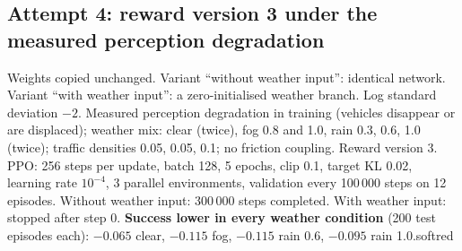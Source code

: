 \subsection{Attempt 4: reward version 3 under the measured perception degradation}
{Weights copied unchanged. Variant ``without weather input'': identical network. Variant ``with weather input'': a zero-initialised weather branch. Log standard deviation $-2$.}
{Measured perception degradation in training (vehicles disappear or are displaced); weather mix: clear (twice), fog 0.8 and 1.0, rain 0.3, 0.6, 1.0 (twice); traffic densities 0.05, 0.05, 0.1; no friction coupling. Reward version 3.}
{PPO: 256 steps per update, batch 128, 5 epochs, clip 0.1, target KL 0.02, learning rate $10^{-4}$, 3 parallel environments, validation every 100\,000 steps on 12 episodes. Without weather input: 300\,000 steps completed. With weather input: stopped after step 0.}
{\textbf{Success lower in every weather condition} (200 test episodes each): $-0.065$ clear, $-0.115$ fog, $-0.115$ rain 0.6, $-0.095$ rain 1.0.}{softred}

